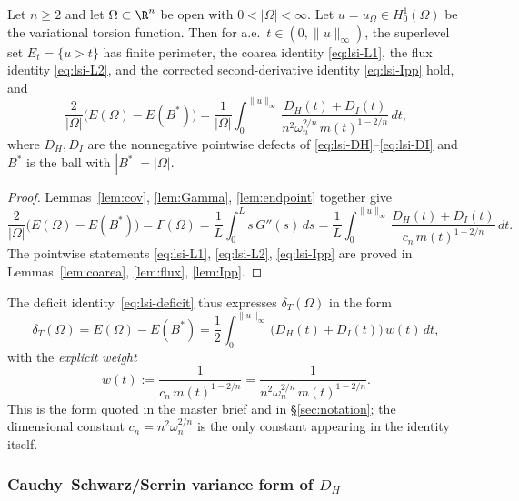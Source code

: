 \begin{theorem}\label{thm:deficit}\label{thm:lsid:identity}\label{thm:plan2-levelset-id}
Let $n\ge 2$ and let $\Omega\subset\R^{n}$ be open with $0<|\Omega|<\infty$.
Let $u=u_{\Omega}\in H^{1}_{0}(\Omega)$ be the variational torsion
function. Then for a.e.\ $t\in(0,\|u\|_{\infty})$, the superlevel set
$E_{t}=\{u>t\}$ has finite perimeter, the coarea identity
\eqref{eq:lsi-L1}, the flux identity \eqref{eq:lsi-L2}, and the corrected
second-derivative identity \eqref{eq:lsi-Ipp} hold, and
\begin{equation}\label{eq:lsi-deficit}
   \boxed{\;
   \frac{2}{|\Omega|}\bigl(E(\Omega)-E(B^{*})\bigr)
   =\frac{1}{|\Omega|}\int_{0}^{\|u\|_{\infty}}
     \frac{D_{H}(t)+D_{I}(t)}{n^{2}\omega_{n}^{2/n}\,m(t)^{1-2/n}}\,dt,\;}
\end{equation}
where $D_{H},D_{I}$ are the nonnegative pointwise defects of
\eqref{eq:lsi-DH}--\eqref{eq:lsi-DI} and $B^{*}$ is the ball with
$|B^{*}|=|\Omega|$.
\end{theorem}

\begin{proof}
Lemmas~\ref{lem:cov}, \ref{lem:Gamma}, \ref{lem:endpoint} together give
\[
   \frac{2}{|\Omega|}\bigl(E(\Omega)-E(B^{*})\bigr)
   =\Gamma(\Omega)
   =\frac{1}{L}\int_{0}^{L}s\,G''(s)\,ds
   =\frac{1}{L}\int_{0}^{\|u\|_{\infty}}\frac{D_{H}(t)+D_{I}(t)}
     {c_{n}\,m(t)^{1-2/n}}\,dt.
\]
The pointwise statements \eqref{eq:lsi-L1}, \eqref{eq:lsi-L2},
\eqref{eq:lsi-Ipp} are proved in Lemmas~\ref{lem:coarea},
\ref{lem:flux}, \ref{lem:Ipp}.
\end{proof}

The deficit identity~\eqref{eq:lsi-deficit} thus expresses
$\delta_{T}(\Omega)$ in the form
\[
   \delta_{T}(\Omega)
   =E(\Omega)-E(B^{*})
   =\frac{1}{2}\int_{0}^{\|u\|_{\infty}}\bigl(D_{H}(t)+D_{I}(t)\bigr)\,w(t)\,dt,
\]
with the {\it explicit weight}
\begin{equation}\label{eq:lsi-weight}
   w(t):=\frac{1}{c_{n}\,m(t)^{1-2/n}}
        =\frac{1}{n^{2}\omega_{n}^{2/n}\,m(t)^{1-2/n}}.
\end{equation}
This is the form quoted in the master brief and in
\S\ref{sec:notation}; the dimensional constant $c_{n}=n^{2}\omega_{n}^{2/n}$
is the only constant appearing in the identity itself.

\subsubsection*{Cauchy--Schwarz/Serrin variance form of $D_{H}$}

